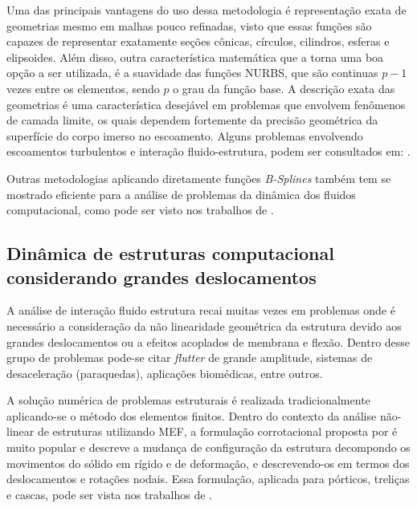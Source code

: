 \documentclass[tese_patricia.tex]{subfiles}
\begin{document}
Uma das principais vantagens do uso dessa metodologia é representação exata de geometrias mesmo em malhas pouco refinadas, visto que essas funções são capazes de representar exatamente seções cônicas, círculos, cilindros, esferas e elipsoides. Além disso, outra característica matemática que a torna uma boa opção a ser utilizada, é a suavidade das funções NURBS, que são continuas $p-1$ vezes entre os elementos, sendo $p$ o grau da função base. A descrição exata das geometrias é uma característica desejável em problemas que envolvem fenômenos de camada limite, os quais dependem fortemente da precisão geométrica da superfície do corpo imerso no escoamento. Alguns problemas envolvendo escoamentos turbulentos e interação fluido-estrutura, podem ser consultados em: .

Outras metodologias aplicando diretamente funções \textit{B-Splines} também tem se mostrado eficiente para a análise de problemas da dinâmica dos fluidos computacional, como pode ser visto nos trabalhos de .

\subsection{Dinâmica de estruturas computacional considerando grandes deslocamentos}
\label{csdsection}

A análise de interação fluido estrutura recai muitas vezes em problemas onde é necessário a consideração da não linearidade geométrica da estrutura devido aos grandes deslocamentos ou a efeitos acoplados de membrana e flexão. Dentro desse grupo de problemas pode-se citar \textit{flutter} de grande amplitude, sistemas de desaceleração (paraquedas), aplicações biomédicas, entre outros.

A solução numérica de problemas estruturais é realizada tradicionalmente aplicando-se o método dos elementos finitos. Dentro do contexto da análise não-linear de estruturas utilizando MEF, a formulação corrotacional proposta por  é muito popular e descreve a mudança de configuração da estrutura decompondo os movimentos do sólido em rígido e de deformação, e descrevendo-os em termos dos deslocamentos e rotações nodais. Essa formulação, aplicada para pórticos, treliças e cascas, pode ser vista nos trabalhos de .
\end{document}
